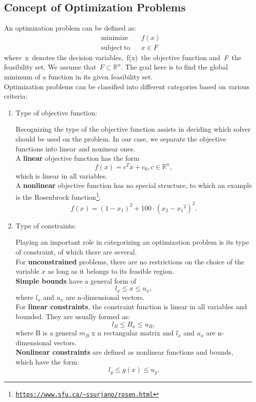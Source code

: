 \documentclass{book}
\begin{document}
\subsection{Concept of Optimization Problems}
An optimization problem\cite{nag} can be defined as:
$${\displaystyle {\begin{aligned}
&{\operatorname{minimize}} &&f(x)\\ &{\operatorname{subject\; to}}&& \mathit x \in \mathit{F}\end{aligned}}}$$ 
where x denotes the decision variables, f(x) the objective function and \textit{F} the feasibility set. We assume that $\mathit{F} \subset \mathbb{R}^n$. The goal here is to find the global minimum of a function in its given feasibility set. \\
\newline
Optimization problems can be classified into different categories based on various criteria:
\begin{enumerate}
\item Type of objective function: 

Recognizing the type of the objective function assists in deciding which solver should be used on the problem. In our case, we separate the objective functions into linear and noninear ones. \\
A \textbf{linear} objective function has the form $${\displaystyle f(x) = c^T x + c_0 , c  \in \mathbb{R}^n,}$$ which is linear in all variables. \\
A \textbf{nonlinear} objective function has no special structure, to which an example is the Rosenbrock function\footnote{\tt \url{https://www.sfu.ca/\~ssurjano/rosen.html}}: $${\displaystyle f(x)=(1-{x_1})^2+100 \cdot ({x_2}-{x_1}^2)^2.}$$ 
\item Type of constraints: 

Playing an important role in categorizing an optimization problem is its type of constraint, of which there are several. \\
For \textbf{unconstrained} problems, there are no restrictions on the choice of the variable ${\displaystyle x}$ as long as it belongs to its feasible region. \\
\textbf{Simple bounds} have a general form of  $${\displaystyle l_x \leq x \leq u_x,}$$ where ${\displaystyle l_x }$ and ${\displaystyle u_x}$ are n-dimensional vectors.\\
For \textbf{linear constraints}, the constraint function is linear in all variables and bounded. They are usually formed as:  $${\displaystyle l_B \leq B_x \leq u_B,}$$ where B is a general ${\displaystyle m_B}$ x n rectangular matrix and ${\displaystyle l_x }$ and ${\displaystyle u_x}$ are n-dimensional vectors.\\
\textbf{Nonlinear constraints} are defined as nonlinear functions and bounds, which have the form: $${\displaystyle  l_g \leq g(x) \leq u_g.}$$
\end{enumerate}
\end{document}
